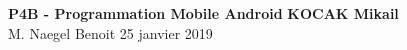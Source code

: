 \noindent
\large\textbf{P4B - Programmation Mobile Android} \hfill \textbf{KOCAK Mikail} \\
\normalsize M. Naegel Benoit \hfill 25 janvier 2019 \\[1pt]

\vspace*{\fill}
    \tableofcontents
\vspace*{\fill}
